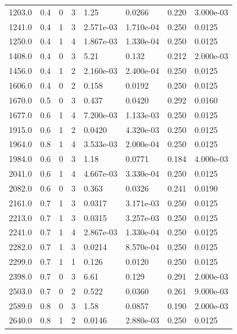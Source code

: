 \documentclass[preview]{standalone}
\begin{document}
{{\begin{tabular}{L{1.2cm}C{1.2cm} C{0.3cm}C{0.5cm} C{1.4cm}C{1.4cm} C{1.4cm}C{1.4cm}}
  1203.0  &   0.4  & 0     &  3 &  1.25  & 0.0266  & 0.220 &  3.000e-03   \\ 
  1241.0  &   0.4  & 1     &  3 &  2.571e-03  & 1.710e-04  & 0.250 &  0.0125   \\ 
  1250.0  &   0.4  & 1     &  4 &  1.867e-03  & 1.330e-04  & 0.250 &  0.0125   \\ 
  1408.0  &   0.4  & 0     &  3 &  5.21  & 0.132  & 0.212 &  2.000e-03   \\ 
  1456.0  &   0.4  & 1     &  2 &  2.160e-03  & 2.400e-04  & 0.250 &  0.0125   \\ 
  1606.0  &   0.4  & 0     &  2 &  0.158  & 0.0192  & 0.250 &  0.0125   \\ 
  1670.0  &   0.5  & 0     &  3 &  0.437  & 0.0420  & 0.292 &  0.0160   \\ 
  1677.0  &   0.6  & 1     &  4 &  7.200e-03  & 1.133e-03  & 0.250 &  0.0125   \\ 
  1915.0  &   0.6  & 1     &  2 &  0.0420  & 4.320e-03  & 0.250 &  0.0125   \\ 
  1964.0  &   0.8  & 1     &  4 &  3.533e-03  & 2.000e-04  & 0.250 &  0.0125   \\ 
  1984.0  &   0.6  & 0     &  3 &  1.18  & 0.0771  & 0.184 &  4.000e-03   \\ 
  2041.0  &   0.6  & 1     &  4 &  4.667e-03  & 3.330e-04  & 0.250 &  0.0125   \\ 
  2082.0  &   0.6  & 0     &  3 &  0.363  & 0.0326  & 0.241 &  0.0190   \\ 
  2161.0  &   0.7  & 1     &  3 &  0.0317  & 3.171e-03  & 0.250 &  0.0125   \\ 
  2213.0  &   0.7  & 1     &  3 &  0.0315  & 3.257e-03  & 0.250 &  0.0125   \\ 
  2241.0  &   0.7  & 1     &  4 &  2.867e-03  & 1.330e-04  & 0.250 &  0.0125   \\ 
  2282.0  &   0.7  & 1     &  3 &  0.0214  & 8.570e-04  & 0.250 &  0.0125   \\ 
  2299.0  &   0.7  & 1     &  1 &  0.126  & 0.0120  & 0.250 &  0.0125   \\ 
  2398.0  &   0.7  & 0     &  3 &  6.61  & 0.129  & 0.291 &  2.000e-03   \\ 
  2503.0  &   0.7  & 0     &  2 &  0.522  & 0.0360  & 0.261 &  9.000e-03   \\ 
  2589.0  &   0.8  & 0     &  3 &  1.58  & 0.0857  & 0.190 &  2.000e-03   \\ 
  2640.0  &   0.8  & 1     &  2 &  0.0146  & 2.880e-03  & 0.250 &  0.0125   \\ 

\end{tabular}}}
\end{document}
